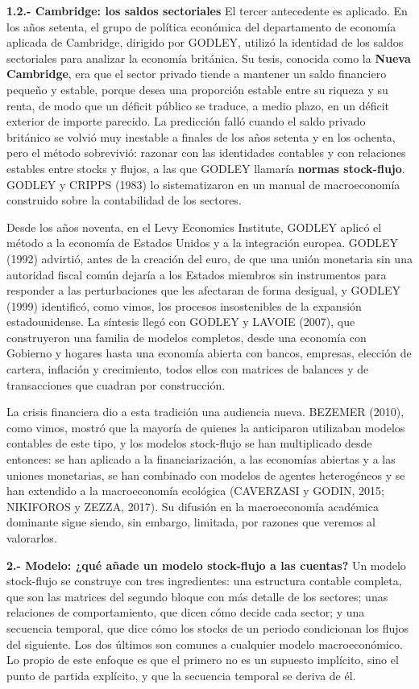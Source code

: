 \documentclass[10pt,a4paper]{article}
\begin{document}
\textbf{1.2.- Cambridge: los saldos sectoriales}
El tercer antecedente es aplicado. En los años setenta, el grupo de política económica del departamento de economía aplicada de Cambridge, dirigido por GODLEY, utilizó la identidad de los saldos sectoriales para analizar la economía británica. Su tesis, conocida como la \textbf{Nueva Cambridge}, era que el sector privado tiende a mantener un saldo financiero pequeño y estable, porque desea una proporción estable entre su riqueza y su renta, de modo que un déficit público se traduce, a medio plazo, en un déficit exterior de importe parecido. La predicción falló cuando el saldo privado británico se volvió muy inestable a finales de los años setenta y en los ochenta, pero el método sobrevivió: razonar con las identidades contables y con relaciones estables entre stocks y flujos, a las que GODLEY llamaría \textbf{normas stock-flujo}. GODLEY y CRIPPS (1983) lo sistematizaron en un manual de macroeconomía construido sobre la contabilidad de los sectores.

Desde los años noventa, en el Levy Economics Institute, GODLEY aplicó el método a la economía de Estados Unidos y a la integración europea. GODLEY (1992) advirtió, antes de la creación del euro, de que una unión monetaria sin una autoridad fiscal común dejaría a los Estados miembros sin instrumentos para responder a las perturbaciones que les afectaran de forma desigual, y GODLEY (1999) identificó, como vimos, los procesos insostenibles de la expansión estadounidense. La síntesis llegó con GODLEY y LAVOIE (2007), que construyeron una familia de modelos completos, desde una economía con Gobierno y hogares hasta una economía abierta con bancos, empresas, elección de cartera, inflación y crecimiento, todos ellos con matrices de balances y de transacciones que cuadran por construcción.

La crisis financiera dio a esta tradición una audiencia nueva. BEZEMER (2010), como vimos, mostró que la mayoría de quienes la anticiparon utilizaban modelos contables de este tipo, y los modelos stock-flujo se han multiplicado desde entonces: se han aplicado a la financiarización, a las economías abiertas y a las uniones monetarias, se han combinado con modelos de agentes heterogéneos y se han extendido a la macroeconomía ecológica (CAVERZASI y GODIN, 2015; NIKIFOROS y ZEZZA, 2017). Su difusión en la macroeconomía académica dominante sigue siendo, sin embargo, limitada, por razones que veremos al valorarlos.

\textbf{2.- Modelo: ¿qué añade un modelo stock-flujo a las cuentas?}
Un modelo stock-flujo se construye con tres ingredientes: una estructura contable completa, que son las matrices del segundo bloque con más detalle de los sectores; unas relaciones de comportamiento, que dicen cómo decide cada sector; y una secuencia temporal, que dice cómo los stocks de un periodo condicionan los flujos del siguiente. Los dos últimos son comunes a cualquier modelo macroeconómico. Lo propio de este enfoque es que el primero no es un supuesto implícito, sino el punto de partida explícito, y que la secuencia temporal se deriva de él.
\end{document}
